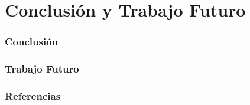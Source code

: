 \documentclass[aspectratio=169]{beamer}%
\begin{document}
\section{Conclusión y Trabajo Futuro}
\begin{frame}[fragile]
	\frametitle{Conclusión}
	\justifying

\end{frame}

\begin{frame}[fragile]
	\frametitle{Trabajo Futuro}
	\justifying

\end{frame}


\begin{frame}[allowframebreaks]
	\frametitle{Referencias}
	\justifying
	
	
\end{frame}



\end{document}
